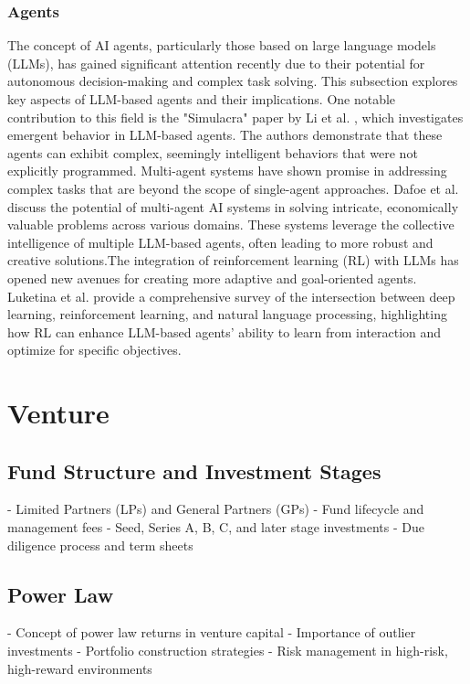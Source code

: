 \documentclass[a4paper, oneside]{discothesis}
\begin{document}
\subsection{Agents}
The concept of AI agents, particularly those based on large language models (LLMs), has gained significant attention recently due to their potential for autonomous decision-making and complex task solving. This subsection explores key aspects of LLM-based agents and their implications.
One notable contribution to this field is the "Simulacra" paper by Li et al. \cite{li2023simulacra}, which investigates emergent behavior in LLM-based agents. The authors demonstrate that these agents can exhibit complex, seemingly intelligent behaviors that were not explicitly programmed.
Multi-agent systems have shown promise in addressing complex tasks that are beyond the scope of single-agent approaches. Dafoe et al. \cite{dafoe2020open} discuss the potential of multi-agent AI systems in solving intricate, economically valuable problems across various domains.
These systems leverage the collective intelligence of multiple LLM-based agents, often leading to more robust and creative solutions.The integration of reinforcement learning (RL) with LLMs has opened new avenues for creating more adaptive and goal-oriented agents. Luketina et al. \cite{luketina2019survey} provide a comprehensive survey of the intersection between deep learning, reinforcement learning, and natural language processing, highlighting how RL can enhance LLM-based agents' ability to learn from interaction and optimize for specific objectives.

\chapter{Venture}
\section{Fund Structure and Investment Stages}
- Limited Partners (LPs) and General Partners (GPs)
- Fund lifecycle and management fees
- Seed, Series A, B, C, and later stage investments
- Due diligence process and term sheets

\section{Power Law}
- Concept of power law returns in venture capital
- Importance of outlier investments
- Portfolio construction strategies
- Risk management in high-risk, high-reward environments
\end{document}
